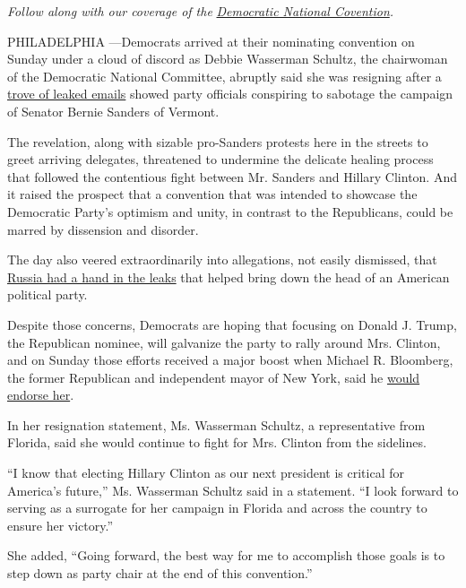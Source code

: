 \emph{Follow along with our coverage of the}
\href{http://www.nytimes.com/2016/07/25/us/politics/democratic-national-convention.html}{\emph{Democratic
National Covention}}\emph{.}

PHILADELPHIA ---Democrats arrived at their nominating convention on
Sunday under a cloud of discord as Debbie Wasserman Schultz, the
chairwoman of the Democratic National Committee, abruptly said she was
resigning after a
\href{http://www.nytimes.com/2016/07/23/us/politics/dnc-emails-sanders-clinton.html?ref=politics}{trove
of leaked emails} showed party officials conspiring to sabotage the
campaign of Senator Bernie Sanders of Vermont.

The revelation, along with sizable pro-Sanders protests here in the
streets to greet arriving delegates, threatened to undermine the
delicate healing process that followed the contentious fight between Mr.
Sanders and Hillary Clinton. And it raised the prospect that a
convention that was intended to showcase the Democratic Party's optimism
and unity, in contrast to the Republicans, could be marred by dissension
and disorder.

The day also veered extraordinarily into allegations, not easily
dismissed, that
\href{http://www.nytimes.com/2016/07/25/us/politics/donald-trump-russia-emails.html}{Russia
had a hand in the leaks} that helped bring down the head of an American
political party.

Despite those concerns, Democrats are hoping that focusing on Donald J.
Trump, the Republican nominee, will galvanize the party to rally around
Mrs. Clinton, and on Sunday those efforts received a major boost when
Michael R. Bloomberg, the former Republican and independent mayor of New
York, said he
\href{http://www.nytimes.com/2016/07/25/us/politics/michael-bloomberg-hillary-clinton-dnc.html}{would
endorse her}.

In her resignation statement, Ms. Wasserman Schultz, a representative
from Florida, said she would continue to fight for Mrs. Clinton from the
sidelines.

``I know that electing Hillary Clinton as our next president is critical
for America's future,'' Ms. Wasserman Schultz said in a statement. ``I
look forward to serving as a surrogate for her campaign in Florida and
across the country to ensure her victory.''

She added, ``Going forward, the best way for me to accomplish those
goals is to step down as party chair at the end of this convention.''

